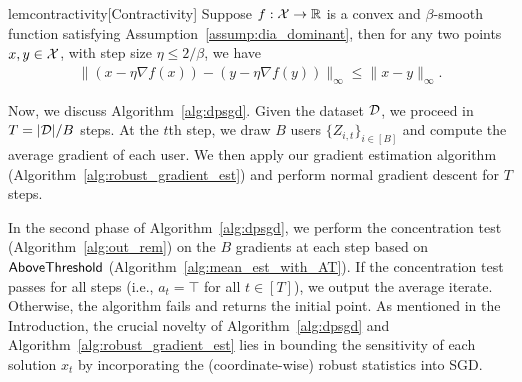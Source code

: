 \begin{restatable}{lem}{contractivity}[Contractivity]
    \label{lm:contractivity}
Suppose $f:\mathcal{X}\to\mathbb{R}$ is a convex and $\beta$-smooth function satisfying Assumption~\ref{assump:dia_dominant}, then for any two points $x,y\in \mathcal{X}$, with step size $\eta\le 2/\beta$, we have
    \begin{align*}
        \|(x-\eta \nabla f(x)) - (y-\eta \nabla f(y))\|_\infty\le \|x-y\|_\infty.
    \end{align*}
\end{restatable}

Now, we discuss Algorithm~\ref{alg:dpsgd}.  
Given the dataset $\mathcal{D}$, we proceed in $T = |\mathcal{D}|/B$ steps.  
At the $t$th step, we draw $B$ users $\{Z_{i,t}\}_{i \in [B]}$ and compute the average gradient of each user. 
We then apply our gradient estimation algorithm (Algorithm~\ref{alg:robust_gradient_est}) and perform normal gradient descent for $T$ steps.  

In the second phase of Algorithm~\ref{alg:dpsgd}, we perform the concentration test  
(Algorithm~\ref{alg:out_rem}) on the $B$ gradients at each step based on $\mathsf{AboveThreshold}$ (Algorithm~\ref{alg:mean_est_with_AT}).  
If the concentration test passes for all steps (i.e., $a_t = \top$  
for all $t \in [T]$), we output the average iterate. Otherwise, the  
algorithm fails and returns the initial point.  
As mentioned in the Introduction, the crucial novelty of Algorithm~\ref{alg:dpsgd}  
and Algorithm~\ref{alg:robust_gradient_est} lies in bounding the sensitivity  
of each solution $x_t$ by incorporating the (coordinate-wise) robust  
statistics into SGD.



